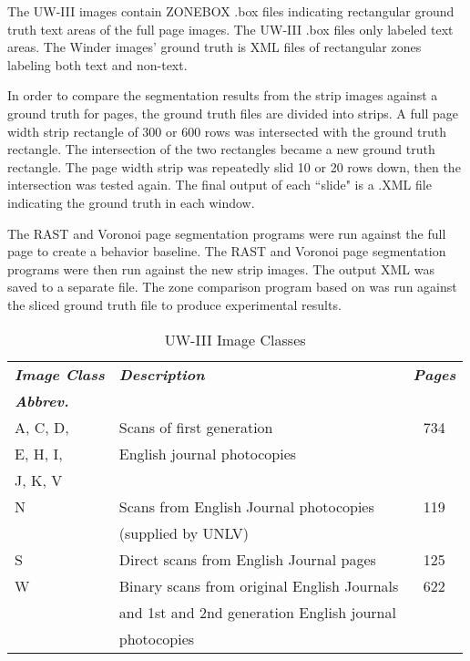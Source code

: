 \documentclass[conference]{IEEEtran}
\begin{document}
The UW-III images contain ZONEBOX .box files indicating rectangular ground truth text
areas of the full page images.  The UW-III .box files only labeled text areas.
The Winder images' ground truth is XML files of rectangular zones labeling both text
and non-text. 

In order to compare the segmentation results from the strip images against a
ground truth for pages, the ground truth files are divided into strips.  A full
page width strip rectangle of 300 or 600 rows was intersected with the
ground truth rectangle. The intersection of the two rectangles became a new ground truth
rectangle. The page width strip was repeatedly slid 10 or 20 rows down, then the
intersection was tested again. The final output of each ``slide" is a .XML file
indicating the ground truth in each window.

The \cite{winder2010extending} RAST and Voronoi page segmentation programs were
run against the full page to create a behavior baseline.  The RAST and Voronoi
page segmentation programs were then run against the new strip images. The output XML
was saved to a separate file. The \cite{winder2010extending} zone comparison
program based on \cite{antonacopoulos2007page} was run against the
sliced ground truth file to produce experimental results. 

\begin{table}
\caption{UW-III Image Classes}
\label{table:UW-III Image Classes}
\begin{tabular}{|l|l|c|}
\hline
\textit{\textbf{Image Class}} & \textit{\textbf{Description}} & \textit{\textbf{Pages}}  \\ 
\textit{\textbf{Abbrev.}} & & \\ 
\hline
    \hline
    A, C, D,   & Scans of first generation & 734 \\
    E, H, I,   & English journal photocopies & \\ 
    J, K, V    &  & \\ 
    \hline
    N & Scans from English Journal photocopies & 119 \\ 
      & (supplied by UNLV) & \\ 
    \hline
    S & Direct scans from English Journal pages & 125 \\ 
    \hline
    W & Binary scans from original English Journals & 622 \\
      & and 1st and 2nd generation English journal & \\
      & photocopies  & \\ 
    \hline
\end{tabular}
\end{table}
\end{document}
